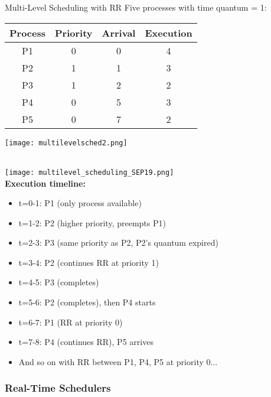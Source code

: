 \begin{example2}{Multi-Level Scheduling with RR}
    Five processes with time quantum = 1:
    
    \begin{minipage}{0.45\linewidth}
    \begin{tabular}{|c|c|c|c|}
        \hline
        Process & Priority & Arrival & Execution \\
        \hline
        P1 & 0 & 0 & 4 \\
        P2 & 1 & 1 & 3 \\
        P3 & 1 & 2 & 2 \\
        P4 & 0 & 5 & 3 \\
        P5 & 0 & 7 & 2 \\
        \hline
    \end{tabular}
    \end{minipage}
    \begin{minipage}{0.55\linewidth} 
    \texttt{[image: multilevelsched2.png]}
    \end{minipage}
    \vspace{2mm}\\
    \texttt{[image: multilevel\_scheduling\_SEP19.png]}
    \vspace{2mm}\\
    \textbf{Execution timeline:}
    \begin{itemize}
        \item t=0-1: P1 (only process available)
        \item t=1-2: P2 (higher priority, preempts P1)
        \item t=2-3: P3 (same priority as P2, P2's quantum expired)
        \item t=3-4: P2 (continues RR at priority 1)
        \item t=4-5: P3 (completes)
        \item t=5-6: P2 (completes), then P4 starts
        \item t=6-7: P1 (RR at priority 0)
        \item t=7-8: P4 (continues RR), P5 arrives
        \item And so on with RR between P1, P4, P5 at priority 0...
    \end{itemize}
\end{example2}







\subsubsection{Real-Time Schedulers}



